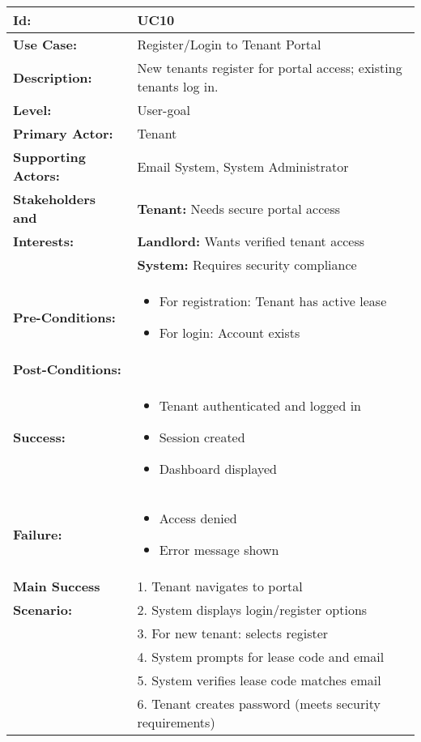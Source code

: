 \documentclass[12pt]{article}
\begin{document}
\begin{tabular}{|p{3cm}|p{11cm}|}
\hline
\textbf{Id:} & UC10 \\
\hline
\textbf{Use Case:} & Register/Login to Tenant Portal \\
\hline
\textbf{Description:} & New tenants register for portal access; existing tenants log in. \\
\hline
\textbf{Level:} & User-goal \\
\hline
\textbf{Primary Actor:} & Tenant \\
\hline
\textbf{Supporting Actors:} & Email System, System Administrator \\
\hline
\textbf{Stakeholders and} & \textbf{Tenant:} Needs secure portal access \\
\textbf{Interests:} & \textbf{Landlord:} Wants verified tenant access \\
& \textbf{System:} Requires security compliance \\
\hline
\textbf{Pre-Conditions:} & 
\begin{itemize}
    \item For registration: Tenant has active lease
    \item For login: Account exists
\end{itemize} \\
\hline
\textbf{Post-Conditions:} & \\
\textbf{Success:} & 
\begin{itemize}
    \item Tenant authenticated and logged in
    \item Session created
    \item Dashboard displayed
\end{itemize} \\
\textbf{Failure:} & 
\begin{itemize}
    \item Access denied
    \item Error message shown
\end{itemize} \\
\hline
\textbf{Main Success} & 1. Tenant navigates to portal \\
\textbf{Scenario:} & 2. System displays login/register options \\
& 3. For new tenant: selects register \\
& 4. System prompts for lease code and email \\
& 5. System verifies lease code matches email \\
& 6. Tenant creates password (meets security requirements) \\

\end{tabular}
\end{document}
